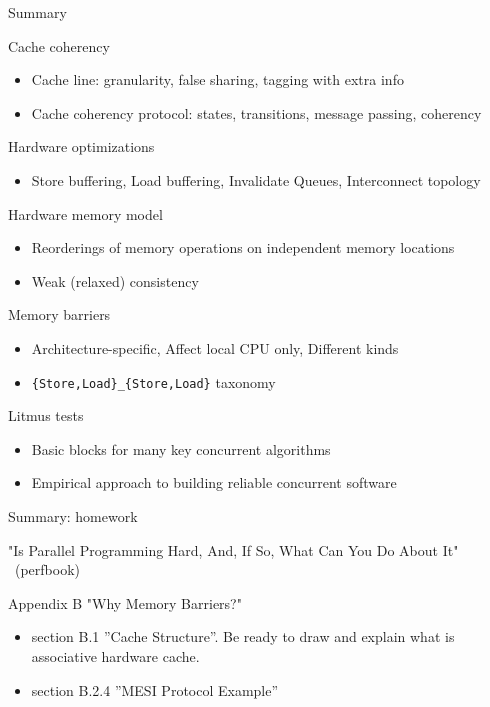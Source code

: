 \begin{frame}{Summary}


Cache coherency
\begin{itemize}
    \item Cache line: granularity, false sharing, tagging with extra info    
    \item Cache coherency protocol: states, transitions, message passing, coherency
\end{itemize}

Hardware optimizations
\begin{itemize}
    \item Store buffering, Load buffering, Invalidate Queues, Interconnect topology
\end{itemize}

Hardware memory model
\begin{itemize}
    \item Reorderings of memory operations on independent memory locations
    \item Weak (relaxed) consistency
\end{itemize}

Memory barriers
\begin{itemize}
    \item Architecture-specific, Affect local CPU only, Different kinds
    \item \texttt{\{Store,Load\}\_\{Store,Load\}} taxonomy
\end{itemize}

Litmus tests
\begin{itemize}
    \item Basic blocks for many key concurrent algorithms
    \item Empirical approach to building reliable concurrent software    
\end{itemize}

\end{frame}


\begin{frame}{Summary: homework}

"Is Parallel Programming Hard, And, If So, What Can You Do About It" \ (perfbook) 

Appendix B "Why Memory Barriers?"

\begin{itemize}
    \item section B.1 ''Cache Structure''. Be ready to draw and explain what is associative hardware cache.
    \item section B.2.4 ''MESI Protocol Example''
\end{itemize}

\end{frame}



